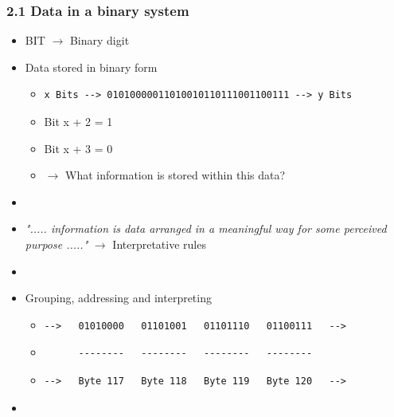 \begin{frame}[fragile]
  \frametitle{2.1 Data in a binary system}
    \begin{itemize}
        \item BIT $\to$ Binary digit
        \item Data stored in binary form
            \begin{itemize}
                \item[] \begin{verbatim}x Bits --> 01010000011010010110111001100111 --> y Bits\end{verbatim}
                \item[] Bit x + 2 = 1
                \item[] Bit x + 3 = 0
                \item[] $\to$ What information is stored within this data?
            \end{itemize}
    \item[]
    \item \emph{"..... information is data arranged in a meaningful way for some perceived purpose ....."} $\to$ Interpretative rules
    \item[]
        \item Grouping, addressing and interpreting
            \begin{itemize}
                \item[] \begin{verbatim}-->   01010000   01101001   01101110   01100111   --> \end{verbatim}
                \item[] \begin{verbatim}      --------   --------   --------   -------- \end{verbatim}
                \item[] \begin{verbatim}-->   Byte 117   Byte 118   Byte 119   Byte 120   --> \end{verbatim}
            \end{itemize}
    \item[]
    \end{itemize}
\end{frame}


